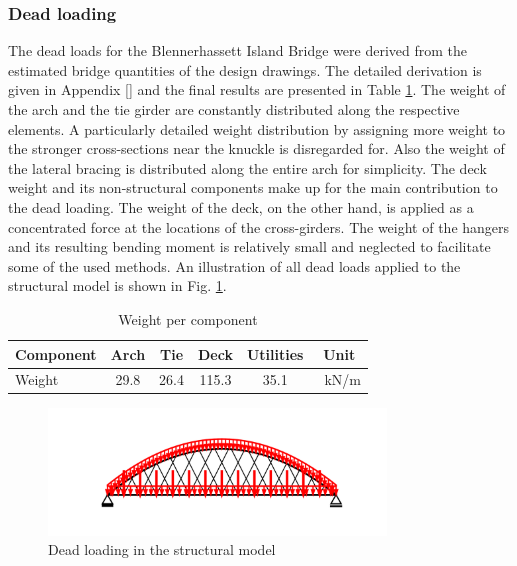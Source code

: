 \subsubsection{Dead loading}
The dead loads for the Blennerhassett Island Bridge were derived from the estimated bridge quantities of the design drawings. The detailed derivation is given in Appendix [] and the final results are presented in Table \ref{tab:dead_loads}. The weight of the arch and the tie girder are constantly distributed along the respective elements. A particularly detailed weight distribution by assigning more weight to the stronger cross-sections near the knuckle is disregarded for. Also the weight of the lateral bracing is distributed along the entire arch for simplicity. The deck weight and its non-structural components make up for the main contribution to the dead loading. The weight of the deck, on the other hand, is applied as a concentrated force at the locations of the cross-girders. The weight of the hangers and its resulting bending moment is relatively small and neglected to facilitate some of the used methods. An illustration of all dead loads applied to the structural model is shown in Fig. \ref{fig:dead_loads}.

\begin{table}[H]
    \centering
    \begin{tabular}{lccccc}
        Component & Arch & Tie & Deck & Utilities & Unit \\ \hline
        Weight & 29.8 & 26.4 & 115.3 & 35.1 & \SI{}{kN/m}
    \end{tabular}
    \caption{Weight per component}
    \label{tab:dead_loads}
\end{table}

\begin{figure}[H]
    \centering
    \includegraphics[trim={0 0.8cm 0 0.8cm},clip,
    width=0.8\textwidth]{illustrations/model overview/permanent loads.png}
    \caption{Dead loading in the structural model}
    \label{fig:dead_loads}
\end{figure}

